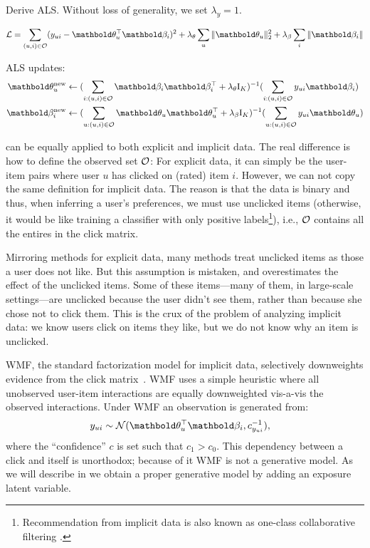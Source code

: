 \PP Derive ALS. Without loss of generality, we set $\lambda_y = 1$.

\begin{equation*}
\cL = \sum_{(u, i)\in \cO} (y_{ui} - \mb\theta_u^\top\mb\beta_i)^2 + \lambda_\theta \sum_u \|\mb\theta_u \|^2_2 + \lambda_\beta \sum_i \|\mb\beta_i \|
\end{equation*}

\PP ALS updates:
\begin{equation}
\begin{split}
\mb\theta_u^\new &\leftarrow (\sum_{i: (u, i) \in \cO} \mb\beta_i \mb\beta_i^\top + \lambda_\theta \mathrm{I}_K)^{-1} (\sum_{i: (u, i) \in \cO} y_{ui} \mb\beta_i)\\
\mb\beta_i^\new &\leftarrow (\sum_{u: (u, i)\in\cO} \mb\theta_u \mb\theta_u^\top + \lambda_\beta \mathrm{I}_K)^{-1} (\sum_{u: (u, i)\in\cO} y_{ui} \mb\theta_u)
\end{split}
\label{chpt:background:eq:als_gmf}
\end{equation}

  can be equally applied to both explicit and implicit data. The real difference is how to define the observed set $\mathcal{O}$: For explicit data, it can simply be the user-item pairs where user $u$ has clicked on (rated) item $i$. However, we can not copy the same definition for implicit data. The reason is that the data is binary and thus, when inferring a user's preferences, we must use unclicked items (otherwise, it would be like training a classifier with only positive labels\footnote{Recommendation from implicit data is also known as one-class collaborative filtering \citep{pan2008one}.}), i.e., $\mathcal{O}$ contains all the entires in the click matrix. 

Mirroring methods for explicit data, many methods treat unclicked items as those a user does not like.  But this assumption is mistaken, and overestimates the effect of the unclicked items.  Some of these
items---many of them, in large-scale settings---are unclicked because
the user didn't see them, rather than because she chose not to
click them.  This is the crux of the problem of analyzing implicit
data: we know users click on items they like, but we do not know why
an item is unclicked.

\gls{WMF}, the standard factorization model for implicit
data, selectively downweights evidence from the click
matrix~\citep{hu2008collaborative}.  \gls{WMF} uses a simple heuristic where all
unobserved user-item interactions are equally downweighted vis-a-vis the
observed interactions. Under \gls{WMF} an observation is generated from:
\begin{align*} 
y_{ui} &\sim \mathcal{N}(\mb\theta_u^\top\mb\beta_i, c^{-1}_{y_{ui}}),
\end{align*}
where the ``confidence'' $c$ is set such that $c_1 > c_0$. This dependency between a
click and itself is unorthodox; because of it \gls{WMF} is not a generative
model. As we will describe in  we obtain a proper generative
model by adding an exposure latent variable. 

